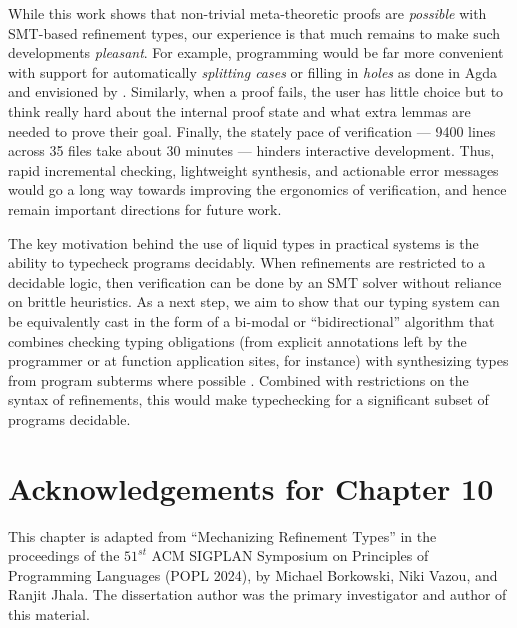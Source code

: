 %
While this work shows that non-trivial
meta-theoretic proofs are \emph{possible}
with SMT-based refinement types, our experience
is that much remains to make such developments
\emph{pleasant}.
%
For example, programming would be far more convenient
with support for automatically \emph{splitting cases}
or filling in \emph{holes} as done in Agda \cite{agda}
and envisioned by \citet{hole_driven_liquid}.
%
Similarly, when a proof fails, the user has little
choice but to think really hard about the internal
proof state and what extra lemmas are needed to prove
their goal.
%
Finally, the stately pace of verification --- 9400 lines
across 35 files take about 30 minutes --- hinders
interactive development.
%
Thus, rapid incremental checking, lightweight synthesis,
and actionable error messages would go a long way towards
improving the ergonomics of verification, and hence remain
important directions for future work.

 The key motivation behind
the use of liquid types in practical systems is the ability to 
typecheck programs decidably.
%
When refinements are restricted to a decidable logic, then 
verification can be done by an SMT solver
without reliance on brittle heuristics.
%
As a next step, we aim to show that our typing system can be
equivalently cast in the form of a bi-modal or ``bidirectional''
algorithm that combines checking typing obligations (from 
explicit annotations left by the programmer or at function
application sites, for instance) 
with synthesizing types from program subterms where possible
\cite{bidir-survey}. 
%
Combined with restrictions on the syntax of refinements, this would 
make typechecking for a significant subset of \sysrfd programs decidable.


\section*{Acknowledgements for Chapter 10}
%
This chapter is adapted from 
``Mechanizing Refinement Types'' in the proceedings of the 
$51^{st}$ ACM SIGPLAN Symposium on Principles of Programming
Languages (POPL 2024), by Michael Borkowski, Niki Vazou, and
Ranjit Jhala.
%
The dissertation author was the primary investigator 
and author of this material.